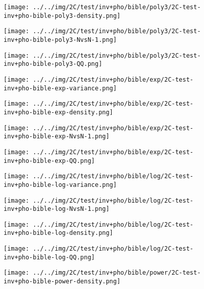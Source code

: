 \begin{figure}[H]
\centering	\texttt{[image: ../../img/2C/test/inv+pho/bible/poly3/2C-test-inv+pho-bible-poly3-density.png]}
\end{figure}
\begin{figure}[H]
\centering	\texttt{[image: ../../img/2C/test/inv+pho/bible/poly3/2C-test-inv+pho-bible-poly3-NvsN-1.png]}
\end{figure}
\begin{figure}[H]
\centering	\texttt{[image: ../../img/2C/test/inv+pho/bible/poly3/2C-test-inv+pho-bible-poly3-QQ.png]}
\end{figure}
\begin{figure}[H]
\centering	\texttt{[image: ../../img/2C/test/inv+pho/bible/exp/2C-test-inv+pho-bible-exp-variance.png]}
\end{figure}
\begin{figure}[H]
\centering	\texttt{[image: ../../img/2C/test/inv+pho/bible/exp/2C-test-inv+pho-bible-exp-density.png]}
\end{figure}
\begin{figure}[H]
\centering	\texttt{[image: ../../img/2C/test/inv+pho/bible/exp/2C-test-inv+pho-bible-exp-NvsN-1.png]}
\end{figure}
\begin{figure}[H]
\centering	\texttt{[image: ../../img/2C/test/inv+pho/bible/exp/2C-test-inv+pho-bible-exp-QQ.png]}
\end{figure}
\begin{figure}[H]
\centering	\texttt{[image: ../../img/2C/test/inv+pho/bible/log/2C-test-inv+pho-bible-log-variance.png]}
\end{figure}
\begin{figure}[H]
\centering	\texttt{[image: ../../img/2C/test/inv+pho/bible/log/2C-test-inv+pho-bible-log-NvsN-1.png]}
\end{figure}
\begin{figure}[H]
\centering	\texttt{[image: ../../img/2C/test/inv+pho/bible/log/2C-test-inv+pho-bible-log-density.png]}
\end{figure}
\begin{figure}[H]
\centering	\texttt{[image: ../../img/2C/test/inv+pho/bible/log/2C-test-inv+pho-bible-log-QQ.png]}
\end{figure}
\begin{figure}[H]
\centering	\texttt{[image: ../../img/2C/test/inv+pho/bible/power/2C-test-inv+pho-bible-power-density.png]}
\end{figure}

